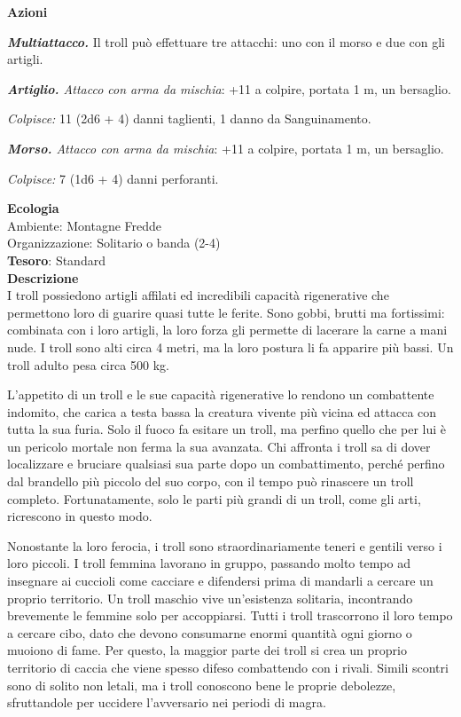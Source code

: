\begin{multicols}{2}
	\textbf{Azioni}

	\textit{\textbf{Multiattacco.}} Il troll può effettuare tre attacchi: uno con il morso e due con gli artigli.

	\textit{\textbf{Artiglio.} Attacco con arma da mischia}: +11 a colpire, portata 1 m, un bersaglio.

	\textit{Colpisce:} 11 (2d6 + 4) danni taglienti, 1 danno da Sanguinamento.

	\textit{\textbf{Morso.} Attacco con arma da mischia}: +11 a colpire, portata 1 m, un bersaglio.

	\textit{Colpisce:} 7 (1d6 + 4) danni perforanti.

	\textbf{Ecologia}\\
	Ambiente: Montagne Fredde\\
	Organizzazione: Solitario o banda (2-4)\\
	\textbf{Tesoro}: Standard\\
	\textbf{Descrizione}\\
	I troll possiedono artigli affilati ed incredibili capacità rigenerative che permettono loro di guarire quasi tutte le ferite. Sono gobbi, brutti ma fortissimi: combinata con i loro artigli, la loro forza gli permette di lacerare la carne a mani nude. I troll sono alti circa 4 metri, ma la loro postura li fa apparire più bassi. Un troll adulto pesa circa 500 kg.

	L'appetito di un troll e le sue capacità rigenerative lo rendono un combattente indomito, che carica a testa bassa la creatura vivente più vicina ed attacca con tutta la sua furia. Solo il fuoco fa esitare un troll, ma perfino quello che per lui è un pericolo mortale non ferma la sua avanzata. Chi affronta i troll sa di dover localizzare e bruciare qualsiasi sua parte dopo un combattimento, perché perfino dal brandello più piccolo del suo corpo, con il tempo può rinascere un troll completo. Fortunatamente, solo le parti più grandi di un troll, come gli arti, ricrescono in questo modo.

	Nonostante la loro ferocia, i troll sono straordinariamente teneri e gentili verso i loro piccoli. I troll femmina lavorano in gruppo, passando molto tempo ad insegnare ai cuccioli come cacciare e difendersi prima di mandarli a cercare un proprio territorio. Un troll maschio vive un'esistenza solitaria, incontrando brevemente le femmine solo per accoppiarsi. Tutti i troll trascorrono il loro tempo a cercare cibo, dato che devono consumarne enormi quantità ogni giorno o muoiono di fame. Per questo, la maggior parte dei troll si crea un proprio territorio di caccia che viene spesso difeso combattendo con i rivali. Simili scontri sono di solito non letali, ma i troll conoscono bene le proprie debolezze, sfruttandole per uccidere l'avversario nei periodi di magra.


\end{multicols}
